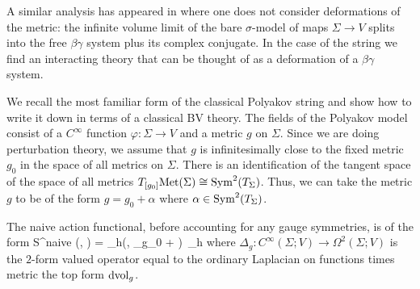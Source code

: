\begin{rmk} 
A similar analysis has appeared in \cite{GGW} where one does not consider deformations of the metric: the infinite volume limit of the bare $\sigma$-model of maps $\Sigma \to V$ splits into the free $\beta\gamma$ system plus its complex conjugate. In the case of the string we find an interacting theory that can be thought of as a deformation of a $\beta\gamma$ system. 
\end{rmk}



We recall the most familiar form of the classical Polyakov string and show how to write it down in terms of a classical BV theory. The fields of the Polyakov model consist of a $C^\infty$ function $\varphi : \Sigma \to V$ and a metric $g$ on $\Sigma$. Since we are doing perturbation theory, we assume that $g$ is infinitesimally close to the fixed metric $g_0$ in the space of all metrics on $\Sigma$. There is an identification of the tangent space of the space of all metrics $T_{[g_0]} {\rm Met}(\Sigma) \cong {\rm Sym}^2(T_\Sigma)$. Thus, we can take the metric $g$ to be of the form $g = g_0 + \alpha$ where $\alpha \in {\rm Sym}^2(T_\Sigma)$. 
 
The naive action functional, before accounting for any gauge symmetries, is of the form
\ben
S^{naive} (\varphi, \alpha) = \int_\Sigma h(\varphi, \Delta_{g_0 + \alpha} \varphi)\, \dvol_h
\een
where $\Delta_g : C^\infty(\Sigma ; V) \to \Omega^2(\Sigma ; V)$ is the $2$-form valued operator equal to the ordinary Laplacian on functions times metric the top form ${\rm dvol}_g$. 


